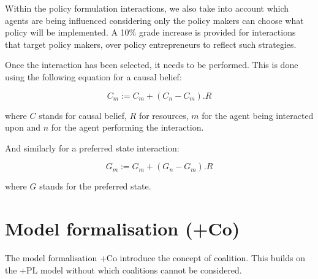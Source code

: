 \documentclass[11pt]{article}
\begin{document}
Within the policy formulation interactions, we also take into account which agents are being influenced considering only the policy makers can choose what policy will be implemented. A 10\% grade increase is provided for interactions that target policy makers, over policy entrepreneurs to reflect such strategies.


Once the interaction has been selected, it needs to be performed. This is done using the following equation for a causal belief:

\begin{equation}
C_{m} := C_{m} + (C_{n} - C_{m}). R
\end{equation}

where $C$ stands for causal belief, $R$ for resources, $m$ for the agent being interacted upon and $n$ for the agent performing the interaction.

And similarly for a preferred state interaction:

\begin{equation}
G_{m} := G_{m} + (G_{n} - G_{m}). R
\end{equation}

where $G$ stands for the preferred state.




\section{Model formalisation (+Co)}

The model formalisation +Co introduce the concept of coalition. This builds on the +PL model without which coalitions cannot be considered.
\end{document}
